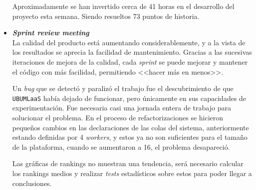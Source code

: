 \begin{itemize}
Aproximadamente se han invertido cerca de 41 horas en el desarrollo del proyecto esta semana. Siendo resueltos 73 puntos de historia.

\item \textbf{\textit{Sprint review meeting}}\\
La calidad del producto está aumentando considerablemente, y a la vista de los resultados se aprecia la facilidad de mantenimiento. Gracias a las sucesivas iteraciones de mejora de la calidad, cada \textit{sprint} se puede mejorar y mantener el código con más facilidad, permitiendo <<hacer más en menos>>.

Un \textit{bug} que se detectó y paralizó el trabajo fue el descubrimiento de que \texttt{UBUMLaaS} había dejado de funcionar, pero únicamente en sus capacidades de experimentación. Fue necesaria casi una jornada entera de trabajo para solucionar el problema. En el proceso de refactorizaciones se hicieron pequeños cambios en las declaraciones de las colas del sistema, anteriormente estando definidas por 4 \textit{workers}, y estos ya no son suficientes para el tamaño de la plataforma, cuando se aumentaron a 16, el problema desapareció.

Las gráficas de rankings no muestran una tendencia, será necesario calcular los rankings medios y realizar \textit{tests} estadísticos sobre estos para poder llegar a conclusiones.
\end{itemize}

